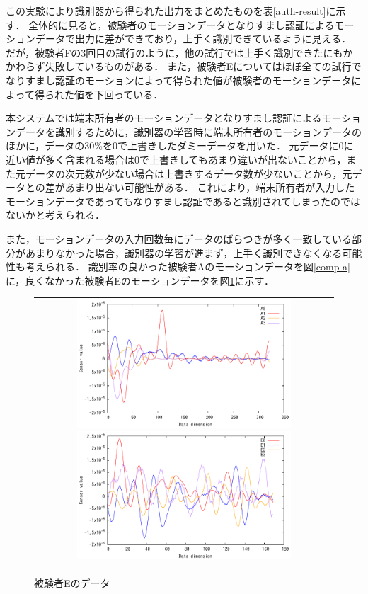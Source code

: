 この実験により識別器から得られた出力をまとめたものを表\ref{auth-result}に示す．
全体的に見ると，被験者のモーションデータとなりすまし認証によるモーションデータで出力に差ができており，上手く識別できているように見える．
だが，被験者Fの3回目の試行のように，他の試行では上手く識別できたにもかかわらず失敗しているものがある．
また，被験者Eについてはほぼ全ての試行でなりすまし認証のモーションによって得られた値が被験者のモーションデータによって得られた値を下回っている．

本システムでは端末所有者のモーションデータとなりすまし認証によるモーションデータを識別するために，識別器の学習時に端末所有者のモーションデータのほかに，データの30\%を0で上書きしたダミーデータを用いた．
元データに0に近い値が多く含まれる場合は0で上書きしてもあまり違いが出ないことから，また元データの次元数が少ない場合は上書きするデータ数が少ないことから，元データとの差があまり出ない可能性がある．
これにより，端末所有者が入力したモーションデータであってもなりすまし認証であると識別されてしまったのではないかと考えられる．

また，モーションデータの入力回数毎にデータのばらつきが多く一致している部分があまりなかった場合，識別器の学習が進まず，上手く識別できなくなる可能性も考えられる．
識別率の良かった被験者Aのモーションデータを図\ref{comp-a}に，良くなかった被験者Eのモーションデータを図\ref{comp-e}に示す．

\begin{figure}[bthp]
  \centering
  \begin{tabular}{c}
    \begin{minipage}{.48\hsize}
      \centering
      \includegraphics[bb=0 0 360 216, width=8cm]{Graphs/comp_A.pdf}
      \caption{被験者Aのデータ}
      \label{comp-a}
    \end{minipage}
    \begin{minipage}{.48\hsize}
      \centering
      \includegraphics[bb=0 0 360 216, width=8cm]{Graphs/comp_E.pdf}
      \caption{被験者Eのデータ}
      \label{comp-e}
    \end{minipage}
  \end{tabular}
\end{figure}

